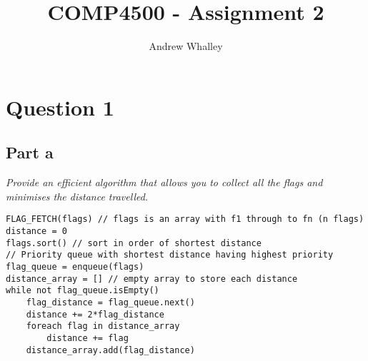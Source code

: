 \documentclass{article}
\begin{document}
\title{COMP4500 - Assignment 2}
\author{Andrew Whalley}
\date{}

\maketitle

\section{Question 1}
\subsection{Part a}
{\em Provide an efficient algorithm that allows you to collect all the flags and minimises the distance travelled.}\\
\begin{lstlisting}
FLAG_FETCH(flags) // flags is an array with f1 through to fn (n flags)
distance = 0
flags.sort() // sort in order of shortest distance
// Priority queue with shortest distance having highest priority
flag_queue = enqueue(flags)
distance_array = [] // empty array to store each distance
while not flag_queue.isEmpty()
    flag_distance = flag_queue.next()
    distance += 2*flag_distance
    foreach flag in distance_array
        distance += flag
    distance_array.add(flag_distance)
\end{lstlisting}
\end{document}
